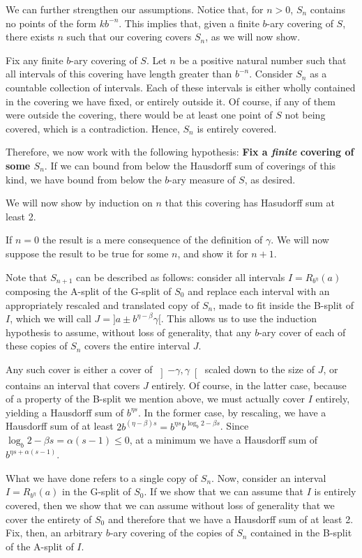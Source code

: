 \documentclass[11pt, reqno]{amsart}
\begin{document}
We can further strengthen our assumptions. Notice that, for $n > 0$, $S_n$ contains no points of the form $k b^{-n}$. This implies that, given a finite $b$-ary covering of $S$, there exists $n$ such that our covering covers $S_n$, as we will now show.

Fix any finite $b$-ary covering of $S$. Let $n$ be a positive natural number such that all intervals of this covering have length greater than $b^{-n}$. Consider $S_n$ as a countable collection of intervals. Each of these intervals is either wholly contained in the covering we have fixed, or entirely outside it. Of course, if any of them were outside the covering, there would be at least one point of $S$ not being covered, which is a contradiction. Hence, $S_n$ is entirely covered.

Therefore, we now work with the following hypothesis: \textbf{Fix a \emph{finite} covering of some $S_n$}. If we can bound from below the Hausdorff sum of coverings of this kind, we have bound from below the $b$-ary measure of $S$, as desired.

We will now show by induction on $n$ that this covering has Hasudorff sum at least 2.

If $n = 0$ the result is a mere consequence of the definition of $\gamma$. We will now suppose the result to be true for some $n$, and show it for $n+1$.

Note that $S_{n+1}$ can be described as follows: consider all intervals $I = R_{b^\eta}(a)$ composing the A-split of the G-split of $S_0$ and replace each interval with an appropriately rescaled and translated copy of $S_n$, made to fit inside the B-split of $I$, which we will call $J = ]a \pm b^{\eta - \beta} \gamma[$. This allows us to use the induction hypothesis to assume, without loss of generality, that any $b$-ary cover of each of these copies of $S_n$ covers the entire interval $J$.

Any such cover is either a cover of $\left]-\gamma, \gamma \right[$ scaled down to the size of $J$, or contains an interval that covers $J$ entirely. Of course, in the latter case, because of a property of the B-split we mention above, we must actually cover $I$ entirely, yielding a Hausdorff sum of $b^{\eta s}$. In the former case, by rescaling, we have a Hausdorff sum of at least $2 b^{(\eta - \beta) s} = b^{\eta s} b^{\log_b 2 - \beta s}$. Since $\log_b 2 - \beta s = \alpha (s - 1) \leq 0$, at a minimum we have a Hausdorff sum of $b^{\eta s + \alpha (s - 1)}$.

What we have done refers to a single copy of $S_n$. Now, consider an interval $I = R_{b^\eta}(a)$ in the G-split of $S_0$. If we show that we can assume that $I$ is entirely covered, then we show that we can assume without loss of generality that we cover the entirety of $S_0$ and therefore that we have a Hausdorff sum of at least 2. Fix, then, an arbitrary $b$-ary covering of the copies of $S_n$ contained in the B-split of the A-split of $I$.
\end{document}
